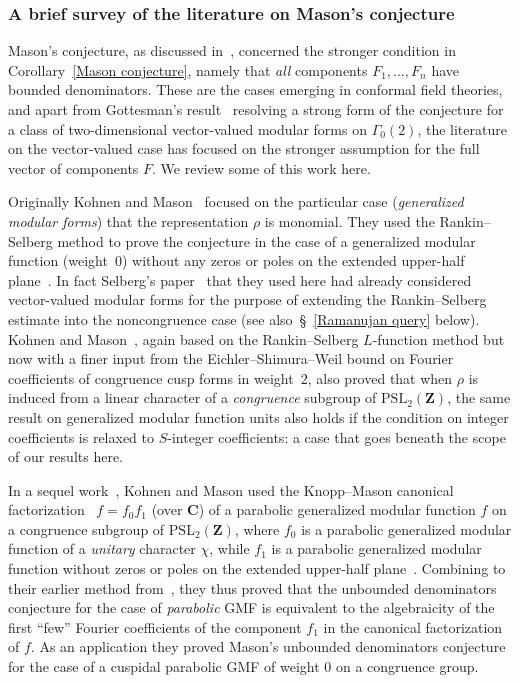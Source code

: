 \documentclass[10pt]{amsart}
\def\PSL{\mathrm{PSL}}
\def\Z{\mathbf{Z}}
\theoremstyle{remark}
\numberwithin{equation}{subsection}
\def\C{\mathbf{C}}
\begin{document}
\subsubsection{A brief survey of the literature on Mason's conjecture}
 Mason's conjecture, as discussed in~\cite{MasonConjectured, KohnenMason, KohnenMason2},  concerned the stronger condition in Corollary~\ref{Mason conjecture}, namely that \emph{all} components $F_1, \ldots, F_n$ have bounded denominators.
These are the cases emerging in conformal field theories, and apart from Gottesman's result~\cite[Theorem~1.7]{Gottesman} resolving a strong form of the conjecture for a  class of two-dimensional vector-valued modular forms on $\Gamma_0(2)$,
  the literature  on the vector-valued case has focused on the stronger assumption for the full vector of components $F$. We review some of this work here. 

Originally Kohnen and Mason~\cite{KohnenMason,KohnenMason2} focused on the particular case (\emph{generalized modular forms})  that the representation $\rho$ is monomial. They used the Rankin--Selberg method to prove the conjecture in the case of a generalized modular function (weight~$0$) without any zeros or poles on the extended upper-half plane~\cite[Theorem~1]{KohnenMason}. In fact Selberg's paper~\cite{Selberg} that they used here had already considered vector-valued modular forms for the purpose of extending the Rankin--Selberg estimate into the noncongruence case (see also~\S~\ref{Ramanujan query} below). Kohnen and Mason~\cite[Theorem~2]{KohnenMason}, again based on the Rankin--Selberg $L$-function method but now with a finer input from the Eichler--Shimura--Weil bound on Fourier coefficients of congruence cusp forms in weight~$2$, also proved that 
when $\rho$ is induced from a linear character of a \emph{congruence} subgroup of $\PSL_2(\Z)$, the same result on generalized modular function units also holds if the condition on integer coefficients is relaxed to $S$-integer coefficients: a case that goes beneath the scope of our results here.  

In a sequel work~\cite{KohnenMason2}, Kohnen and Mason  used the Knopp--Mason canonical factorization~\cite{KnoppMasonFactorization} $f = f_0f_1$ (over $\C$) of a parabolic generalized modular function $f$ on a congruence subgroup of $\PSL_2(\Z)$, where $f_0$ is a parabolic generalized modular function of a \emph{unitary} character $\chi$, while $f_1$ is a parabolic generalized modular function without zeros or poles  on the extended upper-half plane~\cite{KnoppMason}. Combining to  their earlier method from~\cite{KohnenMason}, they thus proved that the unbounded denominators conjecture for the case of \emph{parabolic} GMF is equivalent to the algebraicity of the first ``few'' Fourier coefficients of the component $f_1$ in the canonical factorization of $f$. As an application they proved Mason's unbounded denominators conjecture for the case of a cuspidal parabolic GMF of weight $0$  on a congruence group.  
\end{document}
